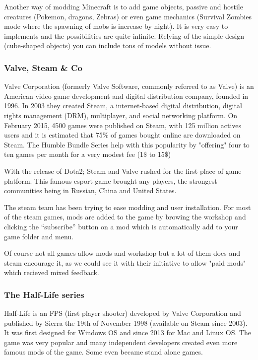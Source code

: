 \documentclass[a4paper,12pt]{article}
\begin{document}
Another way of modding Minecraft is to add game objects, passive and hostile creatures (Pokemon, dragons, Zebras) or even game mechanics (Survival Zombies mode where the spawning of mobs is increase by night). It is very easy to implements and the possibilities are quite infinite. Relying of the simple design (cube-shaped objects) you can include tons of models without issue.

\subsubsection{Valve, Steam \& Co}

Valve Corporation (formerly Valve Software, commonly referred to as Valve) is an American video game development and digital distribution company, founded in 1996. In 2003 they created Steam, a internet-based digital distribution, digital rights management (DRM), multiplayer, and social networking platform. On February 2015, 4500 games were published on Steam, with 125 million actives users and it is estimated that 75\% of games bought online are downloaded on Steam. The Humble Bundle Series help with this popularity by "offering" four to ten games per month for a very modest fee (1\$ to 15\$)

With the release of Dota2; Steam and Valve rushed for the first place of game platform. This famous esport game brought any players, the strongest communities being in Russian, China and United States.

The steam team has been trying to ease modding and user installation. For most of the steam games, mods are added to the game by browing the workshop and clicking the “subscribe” button on a mod which is automatically add to your game folder and menu.

Of course not all games allow mods and workshop but a lot of them does and steam encourage it, as we could see it with their initiative to allow "paid mods" which recieved mixed feedback.

\subsubsection{The Half-Life series}

Half-Life is an FPS (first player shooter) developed by Valve Corporation and published by Sierra the 19th of November 1998 (available on Steam since 2003). It was first designed for Windows OS and since 2013 for Mac and Linux OS. The game was very popular and many independent developers created even more famous mods of the game. Some even became stand alone games.
\end{document}
